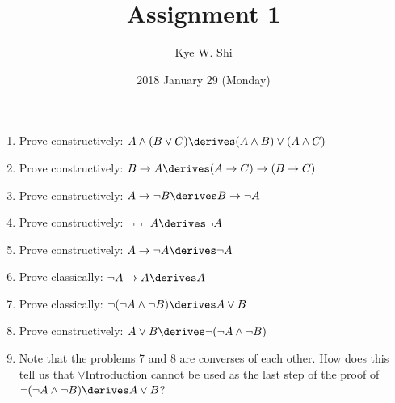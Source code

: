\documentclass{cs81-homework}
\title{Assignment 1}
\author{Kye W. Shi}
\date{2018 January 29 (Monday)}
\begin{document}
\begin{enumerate}
\item Prove constructively:
  \(A \land (B \lor C) \derives (A \land B) \lor (A \land C)\)

  \begin{solution}
  \end{solution}
  
\item Prove constructively: \(B \to A \derives (A \to C) \to (B \to C)\)

  \begin{solution}
  \end{solution}
  
\item Prove constructively: \(A \to \neg B \derives B \to \neg A\)
  
  \begin{solution}
  \end{solution}
  
\item Prove constructively: \(\neg \neg \neg A \derives \neg A\)
  
  \begin{solution}
  \end{solution}
  
\item Prove constructively: \(A \to \neg A \derives \neg A\)
  
  \begin{solution}
  \end{solution}
  
\item Prove classically: \(\neg A \to A \derives A\)
  
  \begin{solution}
  \end{solution}
  
\item Prove classically: \(\neg (\neg A \land \neg B) \derives A \lor B\)
  
  \begin{solution}
  \end{solution}
  
\item Prove constructively: \(A \lor B \derives \neg (\neg A \land \neg B)\)
  
  \begin{solution}
  \end{solution}
  
\item Note that the problems 7 and 8 are converses of each other.  How does this
  tell us that \(\lor\)Introduction cannot be used as the last step of the proof
  of \(\neg (\neg A \land \neg B) \derives A \lor B\)?
  

\end{enumerate}
\end{document}
